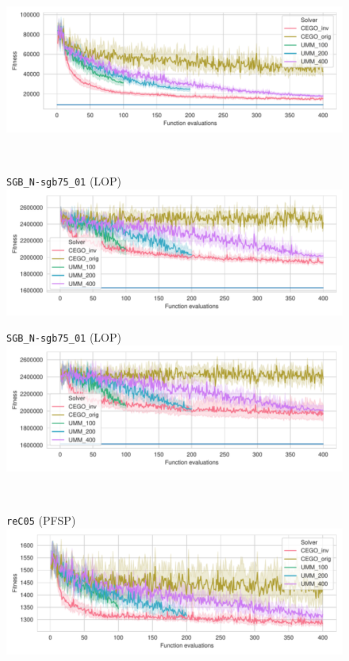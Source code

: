 \documentclass[sigconf,dvipsnames]{acmart}
\begin{document}
\begin{figure}[tb]
\begin{minipage}{0.49\linewidth}
  \includegraphics[width=\textwidth]{../img/fitness_lop_IO_N-t59d11xx}
\end{minipage}
\\
\begin{minipage}{0.49\linewidth}
  \texttt{SGB\_N-sgb75\_01} (LOP)\\[-0.5ex]
  \includegraphics[width=\textwidth]{../img/fitness_lop_SGB_N-sgb75_01}
\end{minipage}
\begin{minipage}{0.49\linewidth}
  \texttt{SGB\_N-sgb75\_01} (LOP)\\[-0.5ex]
  \includegraphics[width=\textwidth]{../img/fitness_lop_SGB_N-sgb75_02}
\end{minipage}
\\
\begin{minipage}{0.49\linewidth}
  \texttt{reC05} (PFSP)\\[-0.5ex]
  \includegraphics[width=\textwidth]{../img/fitness_pfsp_rec05_txt}

\end{minipage}
\end{figure}
\end{document}
